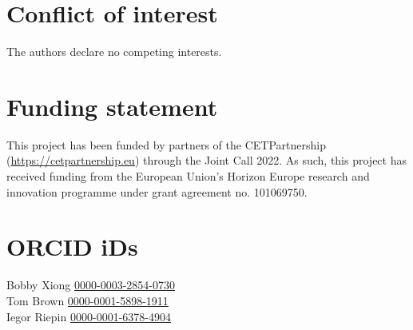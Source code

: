 \documentclass[pdflatex,sn-nature]{sn-jnl}
\theoremstyle{thmstyleone}%
\theoremstyle{thmstyletwo}%
\theoremstyle{thmstylethree}%
\begin{document}
\section*{Conflict of interest}
The authors declare no competing interests.

\section*{Funding statement}
This project has been funded by partners of the CETPartnership (\href{https://cetpartnership.eu}{https://cetpartnership.eu}) through the Joint Call 2022. As such, this project has received funding from the European Union's Horizon Europe research and innovation programme under grant agreement no. 101069750.

\section*{ORCID iDs}
Bobby Xiong \href{https://orcid.org/0000-0003-2854-0730}{0000-0003-2854-0730}\\
Tom Brown \href{https://orcid.org/0000-0001-5898-1911}{0000-0001-5898-1911}\\
Iegor Riepin \href{https://orcid.org/0000-0001-6378-4904}{0000-0001-6378-4904}
\end{document}
